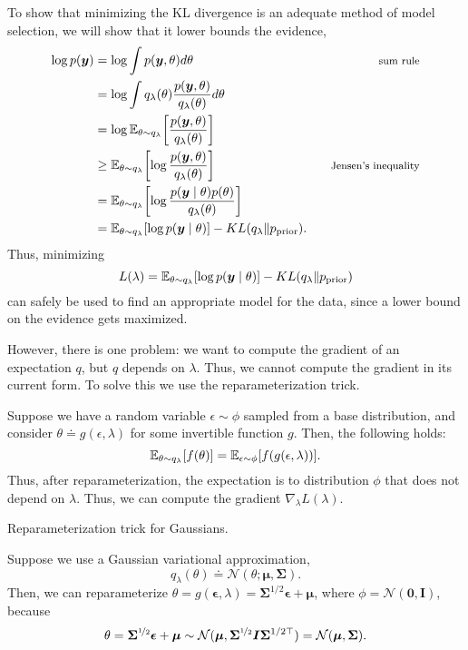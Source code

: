To show that minimizing the KL divergence is an adequate method of model
selection, we will show that it lower bounds the evidence,
\begin{align*}
  \log p(\vec{y}) &= \log \int p(\vec{y},\theta) d\theta & \text{\footnotesize sum rule} \\
  &= \log \int q_\lambda(\theta) \frac{p(\vec{y},\theta)}{q_\lambda(\theta)} d\theta \\
  &= \log \E_{\theta\sim q_\lambda} \lft[ \frac{p(\vec{y},\theta)}{q_\lambda(\theta)} \rgt] \\
  &\geq \E_{\theta\sim q_\lambda} \lft[ \log \frac{p(\vec{y},\theta)}{q_\lambda(\theta)} \rgt] & \text{\footnotesize Jensen's inequality} \\
  &= \E_{\theta\sim q_\lambda} \lft[ \log \frac{p(\vec{y}\mid \theta) p(\theta)}{q_\lambda(\theta)} \rgt] \\
  &= \E_{\theta\sim q_\lambda} [ \log p(\vec{y}\mid \theta) ] - KL(q_\lambda \| p_{\text{prior}})
.\end{align*}
Thus, minimizing \[
  L(\lambda) = \mathbb{E}_{\theta\sim q_\lambda} [ \log p(\bm{y}\mid \theta) ] - KL(q_\lambda \| p_{\text{prior}})
\]
can safely be used to find an appropriate model for the data, since a lower
bound on the evidence gets maximized.

However, there is one problem: we want to compute the gradient of an
expectation \wrt $q$, but $q$ depends on $\lambda$. Thus, we cannot compute
the gradient in its current form. To solve this we use the reparameterization
trick.

\begin{definition}
  Suppose we have a random variable $\epsilon \sim \phi$ sampled from a
  base distribution, and consider $\theta\doteq g(\epsilon,\lambda)$ for some
  invertible function $g$. Then, the following holds: \[
    \mathbb{E}_{\theta\sim q_\lambda} [f(\theta)] = \mathbb{E}_{\epsilon\sim\phi}[f(g(\epsilon,\lambda))]
  .\]
  Thus, after reparameterization, the expectation is \wrt to distribution
  $\phi$ that does not depend on $\lambda$. Thus, we can compute the gradient
  $\nabla_\lambda L(\lambda)$.
\end{definition}

\begin{example}
  \caption{Reparameterization trick for Gaussians.}

  Suppose we use a Gaussian variational approximation, \[
    q_\lambda(\theta) \doteq \mathcal{N}(\theta;\bm{\mu},\bm{\Sigma})
  .\]
  Then, we can reparameterize $\theta = g(\bm{\epsilon},\lambda) =
  \bm{\Sigma}^{1/2} \bm{\epsilon} + \bm{\mu}$, where $\phi =
  \mathcal{N}(\bm{0},\bm{I})$, because \[
    \theta = \bm{\Sigma}^{\nicefrac{1}{2}} \bm{\epsilon} + \bm{\mu} \sim \mathcal{N}(\bm{\mu},\bm{\Sigma}^{\nicefrac{1}{2}}\bm{I}\bm{\Sigma}^{1/2\top}) = \mathcal{N}(\bm{\mu},\bm{\Sigma})
  .\]
\end{example}

